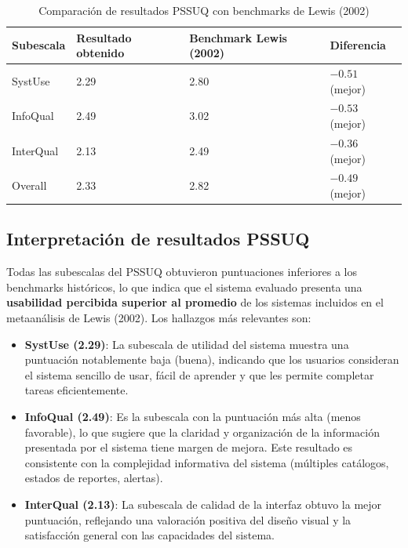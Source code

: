 \documentclass[a4paper,12pt]{report}
\begin{document}
\begin{table}[H]
    \centering
    \caption{Comparación de resultados PSSUQ con benchmarks de Lewis (2002)}
    \label{tab:benchmarks_pssuq}
    \begin{tabular}{p{3cm} p{3cm} p{3cm} p{3.5cm}}
        \toprule
        \textbf{Subescala} & \textbf{Resultado obtenido} & \textbf{Benchmark Lewis (2002)} & \textbf{Diferencia} \\
        \midrule
        SystUse & 2.29 & 2.80 & $-0.51$ (mejor) \\
        InfoQual & 2.49 & 3.02 & $-0.53$ (mejor) \\
        InterQual & 2.13 & 2.49 & $-0.36$ (mejor) \\
        Overall & 2.33 & 2.82 & $-0.49$ (mejor) \\
        \bottomrule
    \end{tabular}
\end{table}

\subsection{Interpretación de resultados PSSUQ}

Todas las subescalas del PSSUQ obtuvieron puntuaciones inferiores a los benchmarks históricos, lo que indica que el sistema evaluado presenta una \textbf{usabilidad percibida superior al promedio} de los sistemas incluidos en el metaanálisis de Lewis (2002). Los hallazgos más relevantes son:

\begin{itemize}
    \item \textbf{SystUse (2.29)}: La subescala de utilidad del sistema muestra una puntuación notablemente baja (buena), indicando que los usuarios consideran el sistema sencillo de usar, fácil de aprender y que les permite completar tareas eficientemente.
    \item \textbf{InfoQual (2.49)}: Es la subescala con la puntuación más alta (menos favorable), lo que sugiere que la claridad y organización de la información presentada por el sistema tiene margen de mejora. Este resultado es consistente con la complejidad informativa del sistema (múltiples catálogos, estados de reportes, alertas).
    \item \textbf{InterQual (2.13)}: La subescala de calidad de la interfaz obtuvo la mejor puntuación, reflejando una valoración positiva del diseño visual y la satisfacción general con las capacidades del sistema.
\end{itemize}
\end{document}
